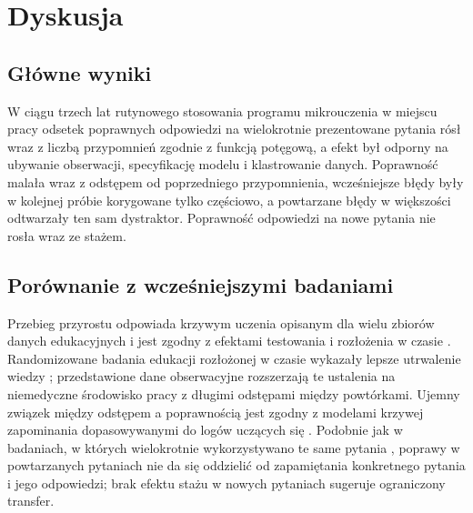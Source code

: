 \section{Dyskusja}

\subsection{Główne wyniki}
W ciągu trzech lat rutynowego stosowania programu mikrouczenia w miejscu pracy odsetek poprawnych
odpowiedzi na wielokrotnie prezentowane pytania rósł wraz z liczbą przypomnień zgodnie z funkcją
potęgową, a efekt był odporny na ubywanie obserwacji, specyfikację modelu i klastrowanie
danych. Poprawność malała wraz z odstępem od poprzedniego przypomnienia, wcześniejsze błędy były
w kolejnej próbie korygowane tylko częściowo, a powtarzane błędy w większości odtwarzały ten sam
dystraktor. Poprawność odpowiedzi na nowe pytania nie rosła wraz ze stażem. %

\subsection{Porównanie z wcześniejszymi badaniami}
Przebieg przyrostu odpowiada krzywym uczenia opisanym dla wielu zbiorów danych
edukacyjnych \citep{koedinger2023} i jest zgodny z efektami testowania i rozłożenia w czasie
\citep{roediger2006,cepeda2006}. Randomizowane badania edukacji rozłożonej w czasie wykazały lepsze
utrwalenie wiedzy \citep{kerfoot2007mededuc,kerfoot2009}; przedstawione dane obserwacyjne rozszerzają te
ustalenia na niemedyczne środowisko pracy z długimi odstępami między powtórkami. Ujemny związek między
odstępem a poprawnością jest zgodny z modelami krzywej zapominania dopasowywanymi do logów uczących się
\citep{settles2016,tabibian2019}. Podobnie jak w badaniach, w których wielokrotnie wykorzystywano te
same pytania \citep{donker2022}, poprawy w powtarzanych pytaniach nie da się oddzielić od zapamiętania
konkretnego pytania i jego odpowiedzi; brak efektu stażu w nowych pytaniach sugeruje ograniczony
transfer.


